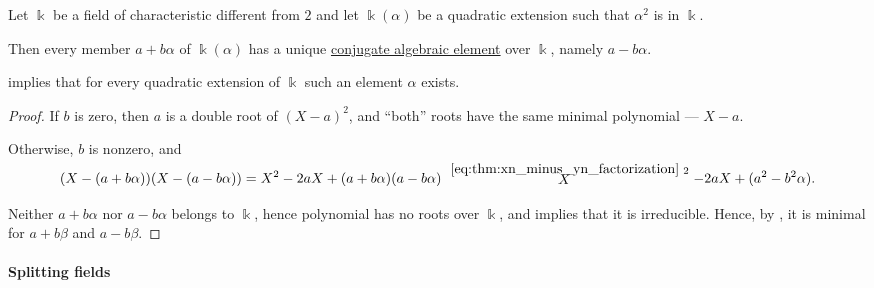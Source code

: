 \begin{proposition}\label{thm:quadratic_extension_conjugate}
  Let \( \Bbbk \) be a field of characteristic different from \( 2 \) and let \( \Bbbk(\alpha) \) be a quadratic extension such that \( \alpha^2 \) is in \( \Bbbk \).

  Then every member \( a + b\alpha \) of \( \Bbbk(\alpha) \) has a unique \hyperref[def:conjugate_algebraic_element]{conjugate algebraic element} over \( \Bbbk \), namely \( a - b\alpha \).
\end{proposition}
\begin{comments}
  \item {} implies that for every quadratic extension of \( \Bbbk \) such an element \( \alpha \) exists.
\end{comments}
\begin{proof}
  If \( b \) is zero, then \( a \) is a double root of \( (X - a)^2 \), and \enquote{both} roots have the same minimal polynomial --- \( X - a \).

  Otherwise, \( b \) is nonzero, and
  \begin{equation*}
    (X - (a + b \alpha)) (X - (a - b \alpha))
    =
    X^2 - 2aX + (a + b \alpha) (a - b \alpha)
    \reloset {\eqref{eq:thm:xn_minus_yn_factorization}}
    X^2 - 2aX + (a^2 - b^2 \alpha).
  \end{equation*}

  Neither \( a + b \alpha \) nor \( a - b \alpha \) belongs to \( \Bbbk \), hence polynomial has no roots over \( \Bbbk \), and  implies that it is irreducible. Hence, by , it is minimal for \( a + b \beta \) and \( a - b \beta \).
\end{proof}

\paragraph{Splitting fields}

